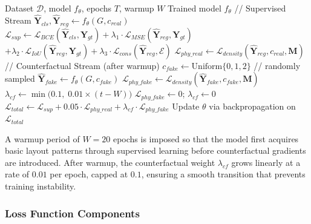 \begin{algorithm}[t]
\caption{Dual-Stream Training}
\label{alg:dual_stream}
\begin{algorithmic}[1]
\REQUIRE Dataset $\mathcal{D}$, model $f_\theta$, epochs $T$, warmup $W$
\ENSURE Trained model $f_\theta$
        \STATE // Supervised Stream
        \STATE $\hat{\mathbf{Y}}_{cls}, \hat{\mathbf{Y}}_{reg} \leftarrow f_\theta(G, c_{real})$
        \STATE $\mathcal{L}_{sup} \leftarrow \mathcal{L}_{BCE}(\hat{\mathbf{Y}}_{cls}, \mathbf{Y}_{gt}) + \lambda_1 \cdot \mathcal{L}_{MSE}(\hat{\mathbf{Y}}_{reg}, \mathbf{Y}_{gt})$
        \STATE \qquad\qquad $+ \lambda_2 \cdot \mathcal{L}_{IoU}(\hat{\mathbf{Y}}_{reg}, \mathbf{Y}_{gt}) + \lambda_3 \cdot \mathcal{L}_{cons}(\hat{\mathbf{Y}}_{reg}, \mathcal{E})$
        \STATE $\mathcal{L}_{phy\_real} \leftarrow \mathcal{L}_{density}(\hat{\mathbf{Y}}_{reg}, c_{real}, \mathbf{M})$
        \STATE
        \STATE // Counterfactual Stream (after warmup)
            \STATE $c_{fake} \leftarrow \text{Uniform}\{0,1,2\}$ \hspace{0.5em} // randomly sampled
            \STATE $\hat{\mathbf{Y}}_{fake} \leftarrow f_\theta(G, c_{fake})$
            \STATE $\mathcal{L}_{phy\_fake} \leftarrow \mathcal{L}_{density}(\hat{\mathbf{Y}}_{fake}, c_{fake}, \mathbf{M})$
            \STATE $\lambda_{cf} \leftarrow \min\bigl(0.1,\; 0.01 \times (t - W)\bigr)$
        \ELSE
            \STATE $\mathcal{L}_{phy\_fake} \leftarrow 0$; \quad $\lambda_{cf} \leftarrow 0$
        \ENDIF
        \STATE
        \STATE $\mathcal{L}_{total} \leftarrow \mathcal{L}_{sup} + 0.05 \cdot \mathcal{L}_{phy\_real} + \lambda_{cf} \cdot \mathcal{L}_{phy\_fake}$
        \STATE Update $\theta$ via backpropagation on $\mathcal{L}_{total}$
    \ENDFOR
\ENDFOR
\end{algorithmic}
\end{algorithm}

A warmup period of $W=20$ epochs is imposed so that the model first acquires basic layout patterns through supervised learning before counterfactual gradients are introduced.
After warmup, the counterfactual weight $\lambda_{cf}$ grows linearly at a rate of $0.01$ per epoch, capped at $0.1$, ensuring a smooth transition that prevents training instability.

\subsubsection{Loss Function Components}

